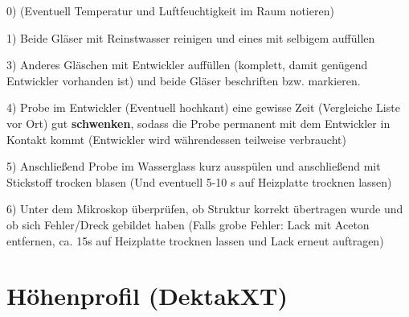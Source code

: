 \documentclass[12pt,a4paper]{article}
\begin{document}
\begin{description}


\item 0) (Eventuell Temperatur und Luftfeuchtigkeit im Raum notieren)

\item 1) Beide Gläser mit Reinstwasser reinigen und eines mit selbigem auffüllen

\item 3) Anderes Gläschen mit Entwickler auffüllen (komplett, damit genügend Entwickler vorhanden ist) und beide Gläser beschriften bzw. markieren.

\item 4) Probe im Entwickler (Eventuell hochkant) eine gewisse Zeit (Vergleiche Liste vor Ort) gut \textbf{schwenken}, sodass die Probe permanent mit dem Entwickler in Kontakt kommt (Entwickler wird währendessen teilweise verbraucht)

\item 5) Anschließend Probe im Wasserglass kurz ausspülen und anschließend mit Stickstoff trocken blasen (Und eventuell 5-10 s auf Heizplatte trocknen lassen)

\item 6) Unter dem Mikroskop überprüfen, ob Struktur korrekt übertragen wurde und ob sich Fehler/Dreck gebildet haben (Falls grobe Fehler: Lack mit Aceton entfernen, ca. 15s auf Heizplatte trocknen lassen und Lack erneut auftragen)

\end{description}

\newpage

\section{Höhenprofil (DektakXT)}
\end{document}
